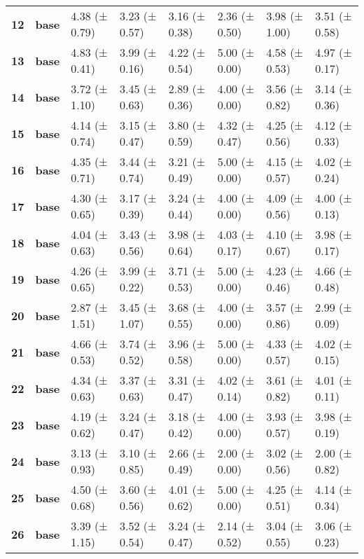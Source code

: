 \begin{longtable}{llllllll}
\cline{1-8}
\textbf{12} & \textbf{base} & 4.38 (± 0.79) & 3.23 (± 0.57) & 3.16 (± 0.38) & 2.36 (± 0.50) & 3.98 (± 1.00) & 3.51 (± 0.58) \\
\cline{1-8}
\textbf{13} & \textbf{base} & 4.83 (± 0.41) & 3.99 (± 0.16) & 4.22 (± 0.54) & 5.00 (± 0.00) & 4.58 (± 0.53) & 4.97 (± 0.17) \\
\cline{1-8}
\textbf{14} & \textbf{base} & 3.72 (± 1.10) & 3.45 (± 0.63) & 2.89 (± 0.36) & 4.00 (± 0.00) & 3.56 (± 0.82) & 3.14 (± 0.36) \\
\cline{1-8}
\textbf{15} & \textbf{base} & 4.14 (± 0.74) & 3.15 (± 0.47) & 3.80 (± 0.59) & 4.32 (± 0.47) & 4.25 (± 0.56) & 4.12 (± 0.33) \\
\cline{1-8}
\textbf{16} & \textbf{base} & 4.35 (± 0.71) & 3.44 (± 0.74) & 3.21 (± 0.49) & 5.00 (± 0.00) & 4.15 (± 0.57) & 4.02 (± 0.24) \\
\cline{1-8}
\textbf{17} & \textbf{base} & 4.30 (± 0.65) & 3.17 (± 0.39) & 3.24 (± 0.44) & 4.00 (± 0.00) & 4.09 (± 0.56) & 4.00 (± 0.13) \\
\cline{1-8}
\textbf{18} & \textbf{base} & 4.04 (± 0.63) & 3.43 (± 0.56) & 3.98 (± 0.64) & 4.03 (± 0.17) & 4.10 (± 0.67) & 3.98 (± 0.17) \\
\cline{1-8}
\textbf{19} & \textbf{base} & 4.26 (± 0.65) & 3.99 (± 0.22) & 3.71 (± 0.53) & 5.00 (± 0.00) & 4.23 (± 0.46) & 4.66 (± 0.48) \\
\cline{1-8}
\textbf{20} & \textbf{base} & 2.87 (± 1.51) & 3.45 (± 1.07) & 3.68 (± 0.55) & 4.00 (± 0.00) & 3.57 (± 0.86) & 2.99 (± 0.09) \\
\cline{1-8}
\textbf{21} & \textbf{base} & 4.66 (± 0.53) & 3.74 (± 0.52) & 3.96 (± 0.58) & 5.00 (± 0.00) & 4.33 (± 0.57) & 4.02 (± 0.15) \\
\cline{1-8}
\textbf{22} & \textbf{base} & 4.34 (± 0.63) & 3.37 (± 0.63) & 3.31 (± 0.47) & 4.02 (± 0.14) & 3.61 (± 0.82) & 4.01 (± 0.11) \\
\cline{1-8}
\textbf{23} & \textbf{base} & 4.19 (± 0.62) & 3.24 (± 0.47) & 3.18 (± 0.42) & 4.00 (± 0.00) & 3.93 (± 0.57) & 3.98 (± 0.19) \\
\cline{1-8}
\textbf{24} & \textbf{base} & 3.13 (± 0.93) & 3.10 (± 0.85) & 2.66 (± 0.49) & 2.00 (± 0.00) & 3.02 (± 0.56) & 2.00 (± 0.82) \\
\cline{1-8}
\textbf{25} & \textbf{base} & 4.50 (± 0.68) & 3.60 (± 0.56) & 4.01 (± 0.62) & 5.00 (± 0.00) & 4.25 (± 0.51) & 4.14 (± 0.34) \\
\cline{1-8}
\textbf{26} & \textbf{base} & 3.39 (± 1.15) & 3.52 (± 0.54) & 3.24 (± 0.47) & 2.14 (± 0.52) & 3.04 (± 0.55) & 3.06 (± 0.23) \\

\end{longtable}
